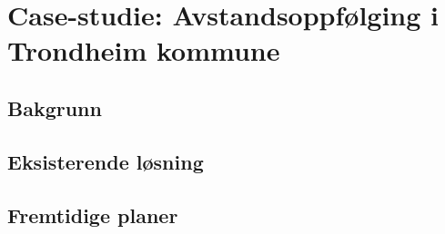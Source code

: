 \chapter{Case-studie: Avstandsoppfølging i Trondheim kommune}
\label{ch:case}
\blindtext

\section{Bakgrunn}
\blindtext

\section{Eksisterende løsning}
\blindtext

\section{Fremtidige planer}
\blindtext
